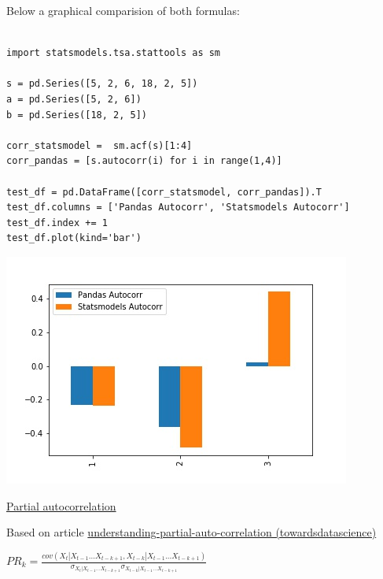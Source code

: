 Below a graphical comparision of both formulas:

\lstset{language=Python}
\lstset{frame=lines}
\lstset{basicstyle=\footnotesize}
\begin{lstlisting}

import statsmodels.tsa.stattools as sm

s = pd.Series([5, 2, 6, 18, 2, 5])
a = pd.Series([5, 2, 6])
b = pd.Series([18, 2, 5])

corr_statsmodel =  sm.acf(s)[1:4]
corr_pandas = [s.autocorr(i) for i in range(1,4)]

test_df = pd.DataFrame([corr_statsmodel, corr_pandas]).T
test_df.columns = ['Pandas Autocorr', 'Statsmodels Autocorr']
test_df.index += 1
test_df.plot(kind='bar')

\end{lstlisting}

\begin{center}
\includegraphics[scale=0.6]{corr_comparison.jpg}
\end{center}

\vspace{5mm}

\underline{Partial autocorrelation}

\vspace{5mm}

Based on article \href{https://towardsdatascience.com/understanding-partial-auto-correlation-fa39271146ac}{understanding-partial-auto-correlation (towardsdatascience)}

\vspace{5mm}

\begin{center}
$PR_k = \frac{cov(X_t | X_{t-1} ... X_{t-k+1},X_{t-k} | X_{t-1} ... X_{t-k+1})}{\sigma_{X_t | X_{t-1} ... X_{t-k+1}} \sigma_{X_{t-k} | X_{t-1} ... X_{t-k+1}}}$
\end{center}

